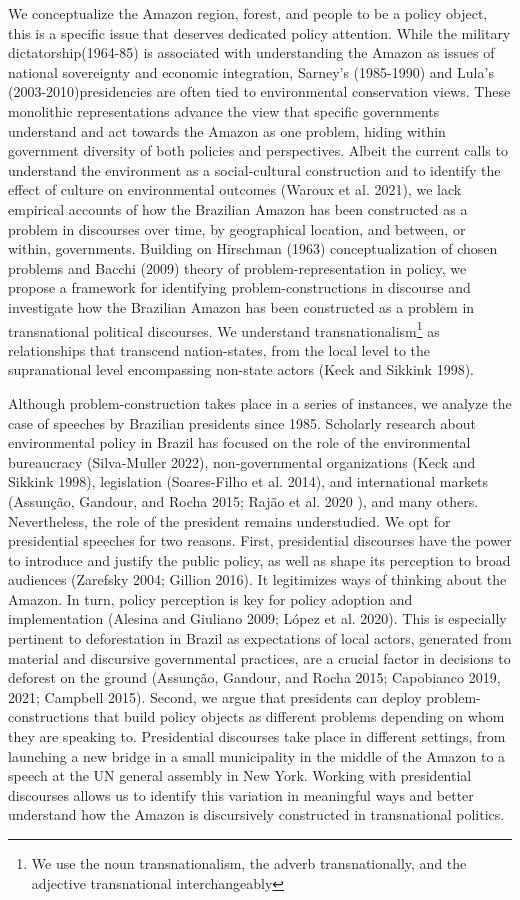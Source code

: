\documentclass[
  12pt,
]{article}
\begin{document}
We conceptualize the Amazon region, forest, and people to be a policy
object, this is a specific issue that deserves dedicated policy
attention. While the military dictatorship(1964-85) is associated with
understanding the Amazon as issues of national sovereignty and economic
integration, Sarney's (1985-1990) and Lula's (2003-2010)presidencies are
often tied to environmental conservation views. These monolithic
representations advance the view that specific governments understand
and act towards the Amazon as one problem, hiding within government
diversity of both policies and perspectives. Albeit the current calls to
understand the environment as a social-cultural construction and to
identify the effect of culture on environmental outcomes (Waroux et al.
2021), we lack empirical accounts of how the Brazilian Amazon has been
constructed as a problem in discourses over time, by geographical
location, and between, or within, governments. Building on Hirschman
(1963) conceptualization of chosen problems and Bacchi (2009) theory of
problem-representation in policy, we propose a framework for identifying
problem-constructions in discourse and investigate how the Brazilian
Amazon has been constructed as a problem in transnational political
discourses. We understand transnationalism\footnote{We use the noun
  transnationalism, the adverb transnationally, and the adjective
  transnational interchangeably} as relationships that transcend
nation-states, from the local level to the supranational level
encompassing non-state actors (Keck and Sikkink 1998).

Although problem-construction takes place in a series of instances, we
analyze the case of speeches by Brazilian presidents since 1985.
Scholarly research about environmental policy in Brazil has focused on
the role of the environmental bureaucracy (Silva-Muller 2022),
non-governmental organizations (Keck and Sikkink 1998), legislation
(Soares-Filho et al. 2014), and international markets (Assunção,
Gandour, and Rocha 2015; Rajão et al. 2020 ), and many others.
Nevertheless, the role of the president remains understudied. We opt for
presidential speeches for two reasons. First, presidential discourses
have the power to introduce and justify the public policy, as well as
shape its perception to broad audiences (Zarefsky 2004; Gillion 2016).
It legitimizes ways of thinking about the Amazon. In turn, policy
perception is key for policy adoption and implementation (Alesina and
Giuliano 2009; López et al. 2020). This is especially pertinent to
deforestation in Brazil as expectations of local actors, generated from
material and discursive governmental practices, are a crucial factor in
decisions to deforest on the ground (Assunção, Gandour, and Rocha 2015;
Capobianco 2019, 2021; Campbell 2015). Second, we argue that presidents
can deploy problem-constructions that build policy objects as different
problems depending on whom they are speaking to. Presidential discourses
take place in different settings, from launching a new bridge in a small
municipality in the middle of the Amazon to a speech at the UN general
assembly in New York. Working with presidential discourses allows us to
identify this variation in meaningful ways and better understand how the
Amazon is discursively constructed in transnational politics.
\end{document}
